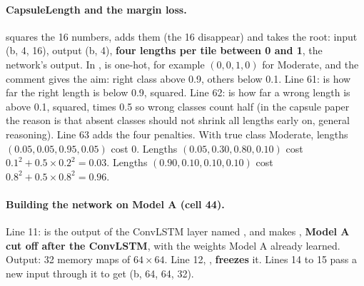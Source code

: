 \paragraph{CapsuleLength and the margin loss.}
 squares the 16 numbers, adds them (the 16 disappear) and takes the root: input (b, 4, 16), output (b, 4), \textbf{four lengths per tile between 0 and 1}, the network's output. In ,  is one-hot, for example $(0,0,1,0)$ for Moderate, and the comment gives the aim: right class above 0.9, others below 0.1. Line 61:  is how far the right length is below 0.9, squared. Line 62:  is how far a wrong length is above 0.1, squared, times 0.5 so wrong classes count half (in the capsule paper the reason is that absent classes should not shrink all lengths early on, general reasoning). Line 63 adds the four penalties. With true class Moderate, lengths $(0.05,0.05,0.95,0.05)$ cost 0. Lengths $(0.05,0.30,0.80,0.10)$ cost $0.1^2+0.5\times0.2^2=0.03$. Lengths $(0.90,0.10,0.10,0.10)$ cost $0.8^2+0.5\times0.8^2=0.96$.


\paragraph{Building the network on Model A (cell 44).}
Line 11:  is the output of the ConvLSTM layer named , and  makes , \textbf{Model A cut off after the ConvLSTM}, with the weights Model A already learned. Output: 32 memory maps of $64\times64$. Line 12, , \textbf{freezes} it. Lines 14 to 15 pass a new input through it to get  (b, 64, 64, 32).

